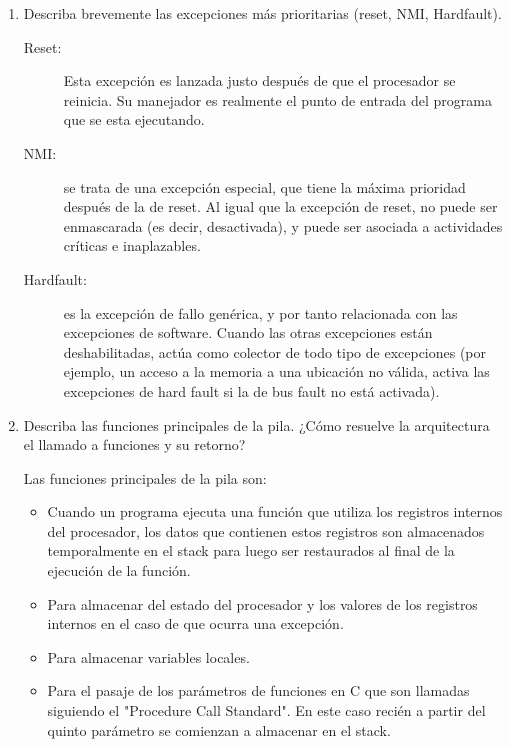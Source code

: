 \documentclass[12pt, a4paper]{article}
\makeatletter
\newcommand\setItemnumber[1]{\setcounter{enum\romannumeral\@enumdepth}{\numexpr#1-1\relax}}
\makeatother
\begin{document}
\begin{enumerate}
    \setItemnumber{9}
    \item Describa brevemente las excepciones más prioritarias (reset, NMI, Hardfault).
    
    \begin{description}
        \item [Reset:] Esta excepción es lanzada justo después de que el procesador se reinicia.
        Su manejador es realmente el punto de entrada del programa que se esta ejecutando.
        \item[NMI:] se trata de una excepción especial, que tiene la máxima prioridad después de 
        la de reset. Al igual que la excepción de reset, no puede ser enmascarada (es decir, desactivada), 
        y puede ser asociada a actividades críticas e inaplazables.
        \item[Hardfault:] es la excepción de fallo genérica, y por tanto relacionada con las excepciones de 
        software. Cuando las otras excepciones están deshabilitadas, actúa como colector de todo tipo de 
        excepciones (por ejemplo, un acceso a la memoria a una ubicación no válida, activa las 
        excepciones de hard fault si la de bus fault no está activada).
        
    \end{description}
    
    \setItemnumber{10} 
    \item Describa las funciones principales de la pila. ¿Cómo resuelve la arquitectura el llamado 
    a funciones y su retorno?
    
    Las funciones principales de la pila son:
    
    \begin{itemize}
        \item Cuando un programa ejecuta una función que utiliza los registros internos del procesador, 
        los datos que contienen estos registros son almacenados temporalmente en el stack para luego ser
        restaurados al final de la ejecución de la función.
        \item Para almacenar del estado del procesador y los valores de los registros internos en 
        el caso de que ocurra una excepción.
        \item Para almacenar variables locales.
        \item Para el pasaje de los parámetros de funciones en C que son llamadas siguiendo 
        el "Procedure Call Standard". En este caso recién a partir del quinto parámetro se 
        comienzan a almacenar en el stack.
     \end{itemize}
    

\end{enumerate}
\end{document}
